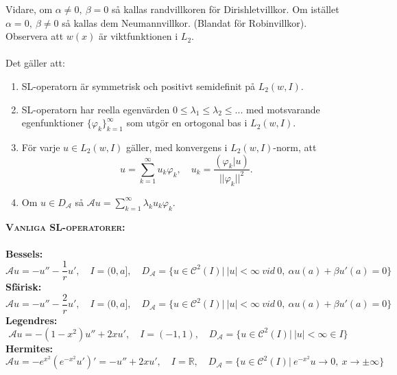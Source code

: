 \documentclass{article}
\begin{document}
Vidare, om $\alpha\neq 0, \ \beta=0$ så kallas randvillkoren för Dirishletvillkor. Om istället $\alpha=0, \ \beta\neq0$ så kallas dem Neumannvillkor. (Blandat för Robinvillkor). Observera att $w(x)$ är viktfunktionen i $L_2$.\\ \\
Det gäller att:
\begin{enumerate}[label=(\roman*)]
\item SL-operatorn är symmetrisk och positivt semidefinit på $L_2(w,I)$.\\
\item SL-operatorn har reella egenvärden $0\leq\lambda_1\leq\lambda_2\leq...$ med motsvarande egenfunktioner $\{\varphi_k\}_{k=1}^{\infty}$ som utgör en ortogonal bas i $L_2(w,I)$.\\
\item För varje $u\in L_2(w,I)$ gäller, med konvergens i $L_2(w,I)$-norm, att
\begin{equation}
    u=\sum_{k=1}^{\infty}u_k\varphi_k, \quad u_k=\frac{(\varphi_k|u)}{||\varphi_k||^2}.
\end{equation}
\item Om $u\in D_{\mathcal{A}}$ så $\mathcal{A}u=\sum_{k=1}^{\infty}\lambda_ku_k\varphi_k$.
\end{enumerate}
\vspace{0.5 cm}
\textsc{\textbf{Vanliga SL-operatorer:}}\\ \\
\textbf{Bessels:}
\begin{equation}
    \mathcal{A}u=-u''-\frac{1}{r}u', \quad I=(0,a], \quad D_{\mathcal{A}}=\{u\in\mathcal{C}^2(I)\big| \ |u|<\infty \  vid \ 0, \ \alpha u(a)+\beta u'(a)=0\}
\end{equation}
\textbf{Sfärisk:}
\begin{equation}
    \mathcal{A}u=-u''-\frac{2}{r}u', \quad I=(0,a], \quad D_{\mathcal{A}}=\{u\in\mathcal{C}^2(I)\big| \ |u|<\infty \  vid \ 0, \ \alpha u(a)+\beta u'(a)=0\}
\end{equation}
\textbf{Legendres:}
\begin{equation}
    \mathcal{A}u=-(1-x^2)u''+2xu', \quad I=(-1,1), \quad D_{\mathcal{A}}=\{u\in\mathcal{C}^2(I)\big| \ |u|<\infty \in I \}
\end{equation}
\textbf{Hermites:}
\begin{equation}
    \mathcal{A}u=-e^{x^2}(e^{-x^2}u')'=-u''+2xu', \quad I=\mathbb{R}, \quad D_{\mathcal{A}}=\{u\in\mathcal{C}^2(I)\big| \ e^{-x^2}u\rightarrow0, \ x\rightarrow \pm \infty \}
\end{equation}\\ \\
\end{document}
